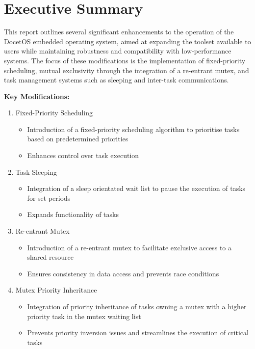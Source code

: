 \section{Executive Summary}
This report outlines several significant enhancements to the operation of the DocetOS embedded operating system, aimed at expanding the toolset available to users while maintaining robustness and compatibility with low-performance systems. The focus of these modifications is the implementation of fixed-priority scheduling, mutual exclusivity through the integration of a re-entrant mutex, and task management systems such as sleeping and inter-task communications.\hfill\break

\textbf{Key Modifications:}
\begin{enumerate}
	\item Fixed-Priority Scheduling
	\begin{itemize}
		\item Introduction of a fixed-priority scheduling algorithm to prioritise tasks based on predetermined priorities
		\item Enhances control over task execution
	\end{itemize}
	
	\item Task Sleeping
	\begin{itemize}
		\item Integration of a sleep orientated wait list to pause the execution of tasks for set periods
		\item Expands functionality of tasks
	\end{itemize}
	
	\item Re-entrant Mutex
	\begin{itemize}
		\item Introduction of a re-entrant mutex to facilitate exclusive access to a shared resource
		\item Ensures consistency in data access and prevents race conditions
	\end{itemize}
	
	\item Mutex Priority Inheritance
	\begin{itemize}
		\item Integration of priority inheritance of tasks owning a mutex with a higher priority task in the mutex waiting list
		\item Prevents priority inversion issues and streamlines the execution of critical tasks
	\end{itemize}
	

\end{enumerate}
